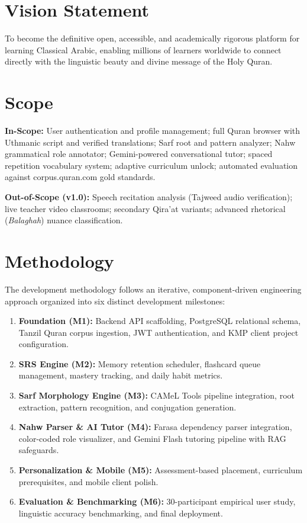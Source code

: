 \documentclass[A4paper,12pt]{article}
\begin{document}
\section{Vision Statement}
To become the definitive open, accessible, and academically rigorous platform for learning Classical Arabic, enabling millions of learners worldwide to connect directly with the linguistic beauty and divine message of the Holy Quran.

\section{Scope}
\textbf{In-Scope:}
User authentication and profile management; full Quran browser with Uthmanic script and verified translations; Sarf root and pattern analyzer; Nahw grammatical role annotator; Gemini-powered conversational tutor; spaced repetition vocabulary system; adaptive curriculum unlock; automated evaluation against corpus.quran.com gold standards.

\textbf{Out-of-Scope (v1.0):}
Speech recitation analysis (Tajweed audio verification); live teacher video classrooms; secondary Qira'at variants; advanced rhetorical (\textit{Balaghah}) nuance classification.

\section{Methodology}
The development methodology follows an iterative, component-driven engineering approach organized into six distinct development milestones:
\begin{enumerate}
    \item \textbf{Foundation (M1):} Backend API scaffolding, PostgreSQL relational schema, Tanzil Quran corpus ingestion, JWT authentication, and KMP client project configuration.
    \item \textbf{SRS Engine (M2):} Memory retention scheduler, flashcard queue management, mastery tracking, and daily habit metrics.
    \item \textbf{Sarf Morphology Engine (M3):} CAMeL Tools pipeline integration, root extraction, pattern recognition, and conjugation generation.
    \item \textbf{Nahw Parser \& AI Tutor (M4):} Farasa dependency parser integration, color-coded role visualizer, and Gemini Flash tutoring pipeline with RAG safeguards.
    \item \textbf{Personalization \& Mobile (M5):} Assessment-based placement, curriculum prerequisites, and mobile client polish.
    \item \textbf{Evaluation \& Benchmarking (M6):} 30-participant empirical user study, linguistic accuracy benchmarking, and final deployment.
\end{enumerate}
\end{document}
